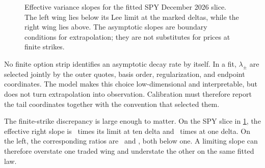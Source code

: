 \begin{figure}[htbp]
\centering
{}
\caption{Effective variance slopes for the fitted SPY December 2026 slice.
The left wing lies below its Lee limit at the marked deltas, while the right
wing lies above.  The asymptotic slopes are boundary conditions for
extrapolation; they are not substitutes for prices at finite strikes.}
\label{fig:lee}
\end{figure}

No finite option strip identifies an asymptotic decay rate by itself.  In a
fit, $\lambda_\pm$ are selected jointly by the outer quotes, basis order,
regularization, and endpoint coordinates.  The model makes this choice
low-dimensional and interpretable, but does not turn extrapolation into
observation.  Calibration must therefore report the tail coordinates together
with the convention that selected them.

The finite-strike discrepancy is large enough to matter.  On the SPY slice
in \cref{fig:lee}, the effective right slope is
\MacLeeRatioTenDeltaCall\ times its limit at ten delta and
\MacLeeRatioOneDeltaCall\ times at one delta.  On the left, the corresponding
ratios are \MacLeeRatioTenDeltaPut\ and \MacLeeRatioOneDeltaPut, both below
one.  A limiting slope can therefore overstate one traded wing and understate
the other on the same fitted law.
